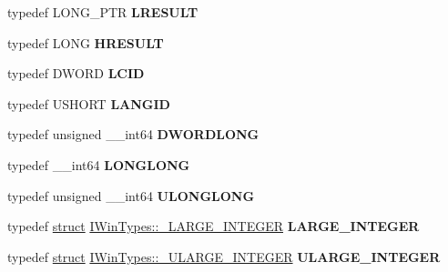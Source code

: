 \begin{DoxyCompactItemize}
\item 
\mbox{\label{interface_i_win_types_abbb7476f7a2b4d4d103996cd93d54c63}} 
typedef L\+O\+N\+G\+\_\+\+P\+TR {\bfseries L\+R\+E\+S\+U\+LT}
\item 
\mbox{\label{interface_i_win_types_ab4dd2444d2c1ca3e95b2bb9ed6d909ff}} 
typedef L\+O\+NG {\bfseries H\+R\+E\+S\+U\+LT}
\item 
\mbox{\label{interface_i_win_types_a51529e90024500f109472387a545888a}} 
typedef D\+W\+O\+RD {\bfseries L\+C\+ID}
\item 
\mbox{\label{interface_i_win_types_ad82cb261e6aab3afecd04e87fcd273d1}} 
typedef U\+S\+H\+O\+RT {\bfseries L\+A\+N\+G\+ID}
\item 
\mbox{\label{interface_i_win_types_ab56393f03aeb1d0d2bdf03f28598a70e}} 
typedef unsigned \+\_\+\+\_\+int64 {\bfseries D\+W\+O\+R\+D\+L\+O\+NG}
\item 
\mbox{\label{interface_i_win_types_a42db1eeb982dc46d5a9c28feaa8644ec}} 
typedef \+\_\+\+\_\+int64 {\bfseries L\+O\+N\+G\+L\+O\+NG}
\item 
\mbox{\label{interface_i_win_types_a54080ba77c16dccdd82650158d40649c}} 
typedef unsigned \+\_\+\+\_\+int64 {\bfseries U\+L\+O\+N\+G\+L\+O\+NG}
\item 
\mbox{\label{interface_i_win_types_accf73d24a4794a590574d15216c5c23a}} 
typedef \hyperlink{interfacestruct}{struct} \hyperlink{struct_i_win_types_1_1___l_a_r_g_e___i_n_t_e_g_e_r}{I\+Win\+Types\+::\+\_\+\+L\+A\+R\+G\+E\+\_\+\+I\+N\+T\+E\+G\+ER} {\bfseries L\+A\+R\+G\+E\+\_\+\+I\+N\+T\+E\+G\+ER}
\item 
\mbox{\label{interface_i_win_types_a77bc10d2165b2002733ef60451dfa704}} 
typedef \hyperlink{interfacestruct}{struct} \hyperlink{struct_i_win_types_1_1___u_l_a_r_g_e___i_n_t_e_g_e_r}{I\+Win\+Types\+::\+\_\+\+U\+L\+A\+R\+G\+E\+\_\+\+I\+N\+T\+E\+G\+ER} {\bfseries U\+L\+A\+R\+G\+E\+\_\+\+I\+N\+T\+E\+G\+ER}
\item 
\mbox{\label{interface_i_win_types_a1dc9c5f6d4868062b6048e1c6d78aed8}} 

\end{DoxyCompactItemize}
